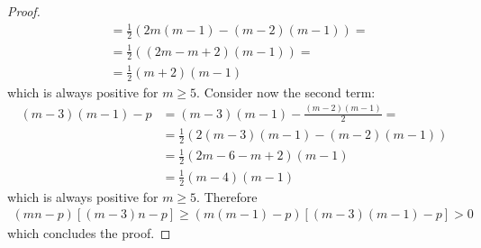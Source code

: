 \begin{proof}
\begin{align*}
		&=\frac{1}{2}(2m(m-1)-(m-2)(m-1))=\\
		&=\frac{1}{2}((2m-m+2)(m-1))=\\
		&=\frac{1}{2}(m+2)(m-1)
	\end{align*}
	which is always positive for $m\geq5$. Consider now the second term:
	\begin{align*}
		(m-3)(m-1)-p &= (m-3)(m-1)-\frac{(m-2)(m-1)}{2}= \\
		&=\frac{1}{2}(2(m-3)(m-1)-(m-2)(m-1))\\
		&=\frac{1}{2}(2m-6-m+2)(m-1)\\
		&=\frac{1}{2}(m-4)(m-1)
	\end{align*}
	which is always positive for $m\geq5$. Therefore
	\begin{align*}
		(mn-p)[(m-3)n-p] \geq (m(m-1)-p)[(m-3)(m-1)-p] > 0 
	\end{align*}
	which concludes the proof.
	
\end{proof}


